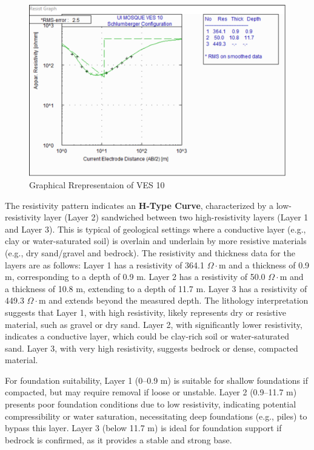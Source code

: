 \documentclass[12pt,a4paper]{report}
\begin{document}
\begin{figure}[H]
    \centering
    \includegraphics[width=1.0\textwidth]{ui_ves10.png}
    \caption{Graphical Rrepresentaion of VES 10}
    \label{fig:VES_10_Curve}
\end{figure}

The resistivity pattern indicates an \textbf{H-Type Curve}, characterized by a low-resistivity layer (Layer 2) sandwiched between two high-resistivity layers (Layer 1 and Layer 3). This is typical of geological settings where a conductive layer (e.g., clay or water-saturated soil) is overlain and underlain by more resistive materials (e.g., dry sand/gravel and bedrock). The resistivity and thickness data for the layers are as follows: Layer 1 has a resistivity of 364.1 $\Omega\cdot$m and a thickness of 0.9 m, corresponding to a depth of 0.9 m. Layer 2 has a resistivity of 50.0 $\Omega\cdot$m and a thickness of 10.8 m, extending to a depth of 11.7 m. Layer 3 has a resistivity of 449.3 $\Omega\cdot$m and extends beyond the measured depth. The lithology interpretation suggests that Layer 1, with high resistivity, likely represents dry or resistive material, such as gravel or dry sand. Layer 2, with significantly lower resistivity, indicates a conductive layer, which could be clay-rich soil or water-saturated sand. Layer 3, with very high resistivity, suggests bedrock or dense, compacted material.

For foundation suitability, Layer 1 (0--0.9 m) is suitable for shallow foundations if compacted, but may require removal if loose or unstable. Layer 2 (0.9--11.7 m) presents poor foundation conditions due to low resistivity, indicating potential compressibility or water saturation, necessitating deep foundations (e.g., piles) to bypass this layer. Layer 3 (below 11.7 m) is ideal for foundation support if bedrock is confirmed, as it provides a stable and strong base.
\end{document}
